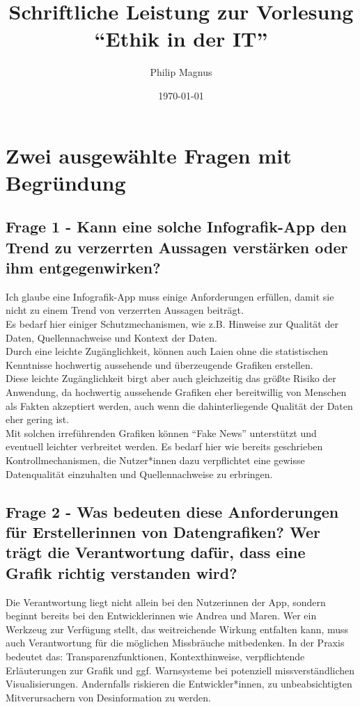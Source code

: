 \documentclass[12pt]{article}
\title{Schriftliche Leistung zur Vorlesung ``Ethik in der IT''}
\author{Philip Magnus}
\date{\today}
\begin{document}
\maketitle

\section{Zwei ausgewählte Fragen mit Begründung}

\subsection*{Frage 1 - Kann eine solche Infografik-App den Trend zu verzerrten Aussagen verstärken oder ihm entgegenwirken?}

Ich glaube eine Infografik-App muss einige Anforderungen erfüllen, damit sie nicht zu einem Trend von verzerrten Aussagen beiträgt.\\
Es bedarf hier einiger Schutzmechanismen, wie z.B. Hinweise zur Qualität der Daten, Quellennachweise und Kontext der Daten.\\
Durch eine leichte Zugänglichkeit, können auch Laien ohne die statistischen Kenntnisse hochwertig aussehende und überzeugende Grafiken erstellen.\\
Diese leichte Zugänglichkeit birgt aber auch gleichzeitig das größte Risiko der Anwendung, da hochwertig aussehende Grafiken eher bereitwillig von Menschen als Fakten akzeptiert werden, auch wenn die dahinterliegende Qualität der Daten eher gering ist.\\
Mit solchen irreführenden Grafiken können ``Fake News'' unterstützt und eventuell leichter verbreitet werden. Es bedarf hier wie bereits geschrieben Kontrollmechanismen, die Nutzer*innen dazu verpflichtet eine gewisse Datenqualität einzuhalten und Quellennachweise zu erbringen.\\

\subsection*{Frage 2 - Was bedeuten diese Anforderungen für Erstellerinnen von Datengrafiken? Wer trägt die Verantwortung dafür, dass eine Grafik richtig verstanden wird?}

Die Verantwortung liegt nicht allein bei den Nutzerinnen der App, sondern beginnt bereits bei den Entwicklerinnen wie Andrea und Maren. 
Wer ein Werkzeug zur Verfügung stellt, das weitreichende Wirkung entfalten kann, muss auch Verantwortung für die möglichen Missbräuche mitbedenken. 
In der Praxis bedeutet das: Transparenzfunktionen, Kontexthinweise, verpflichtende Erläuterungen zur Grafik und ggf. Warnsysteme bei potenziell missverständlichen Visualisierungen. 
Andernfalls riskieren die Entwickler*innen, zu unbeabsichtigten Mitverursachern von Desinformation zu werden.
\end{document}

